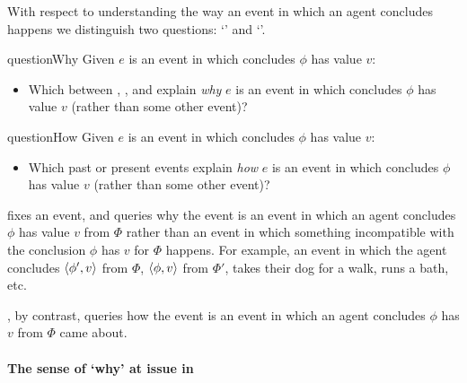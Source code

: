 \begin{note}
  With respect to understanding the way an event in which an agent concludes happens we distinguish two questions:
  `\qWhy{}' and `\qHow{}'.

  \begin{question}{questionWhy}{\qWhy{}}
    Given \(e\) is an event in which \vAgent{} concludes \(\phi\) has value \(v\):
    \begin{itemize}
    \item
      Which \ros{} between , , and  explain \emph{why} \(e\) is an event in which \vAgent{} concludes \(\phi\) has value \(v\) (rather than some other event)?
    \end{itemize}
    \vspace{-1.5\baselineskip}
  \end{question}

  \begin{question}{questionHow}{\qHow{}}
    \label{q:how}
    Given \(e\) is an event in which \vAgent{} concludes \(\phi\) has value \(v\):
    \begin{itemize}
    \item
      Which past or present events explain \emph{how} \(e\) is an event in which \vAgent{} concludes \(\phi\) has value \(v\) (rather than some other event)?
    \end{itemize}
    \vspace{-1.5\baselineskip}
  \end{question}
\end{note}


\begin{note}
  \qWhy{} fixes an event, and queries why the event is an event in which an agent concludes \(\phi\) has value \(v\) from \(\Phi\) rather than an event in which something incompatible with the conclusion \(\phi\) has  \(v\) for \(\Phi\) happens.
  For example, an event in which the agent concludes \(\langle \phi', v \rangle\) from \(\Phi\), \(\langle \phi, v \rangle\) from \(\Phi'\), takes their dog for a walk, runs a bath, etc.

  \qHow{}, by contrast, queries how the event is an event in which an agent concludes \(\phi\) has  \(v\) from \(\Phi\) came about.
\end{note}


\paragraph*{The sense of `why' at issue in \qWhy{}}


